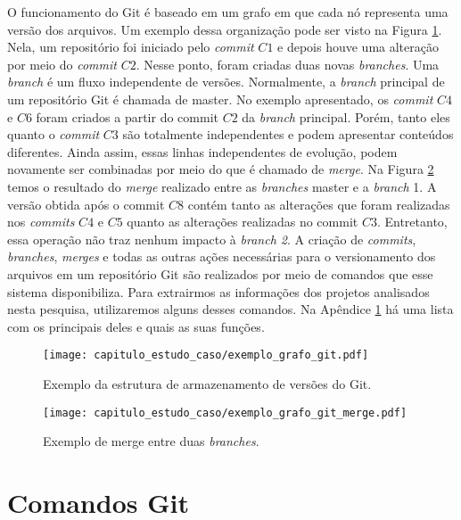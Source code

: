 O funcionamento do Git é baseado em um grafo em que cada nó  representa uma versão dos arquivos. Um exemplo dessa organização pode ser visto na Figura \ref{fig:cap_experimento_exemplo_grafo_git}. Nela, um repositório foi iniciado pelo \textit{commit} $C1$ e depois houve uma alteração por meio do \textit{commit} $C2$. Nesse ponto, foram criadas duas novas \textit{branches}. Uma \textit{branch} é um fluxo independente de versões. Normalmente, a \textit{branch} principal de um repositório Git é chamada de master. No exemplo apresentado, os \textit{commit}  $C4$ e $C6$ foram criados a partir do commit $C2$ da \textit{branch} principal. Porém, tanto eles quanto o \textit{commit} $C3$ são totalmente independentes e podem apresentar conteúdos diferentes. Ainda assim, essas linhas independentes de evolução, podem novamente ser combinadas por meio do que é chamado de \textit{merge}. Na Figura \ref{fig:cap_experimento_exemplo_grafo_git_merge}  temos o resultado do \textit{merge} realizado entre as \textit{branches} master e a \textit{branch} 1. A versão obtida após o commit $C8$ contém tanto as alterações que foram realizadas nos \textit{commits} $C4$ e $C5$ quanto as alterações realizadas no commit $C3$. Entretanto, essa operação não traz nenhum impacto à \textit{branch 2}. A criação de \textit{commits}, \textit{branches}, \textit{merges} e todas as outras ações necessárias para o versionamento dos arquivos em um repositório Git são realizados por meio de comandos que esse sistema disponibiliza. Para extrairmos as informações dos projetos analisados nesta pesquisa, utilizaremos alguns desses comandos.  Na Apêndice \ref{ape:comandos_git} há uma lista com os principais deles e quais as suas funções.  

 \begin{figure}[H]
  \centering
  \texttt{[image: capitulo\_estudo\_caso/exemplo\_grafo\_git.pdf]} 
  \caption{Exemplo da estrutura de armazenamento de versões do Git.}
  \label{fig:cap_experimento_exemplo_grafo_git} 
\end{figure}

 \begin{figure}[H]
  \centering
  \texttt{[image: capitulo\_estudo\_caso/exemplo\_grafo\_git\_merge.pdf]} 
  \caption{Exemplo de merge entre duas \textit{branches}.}
  \label{fig:cap_experimento_exemplo_grafo_git_merge} 
\end{figure}


\section{Comandos Git}
\label{ape:comandos_git}


